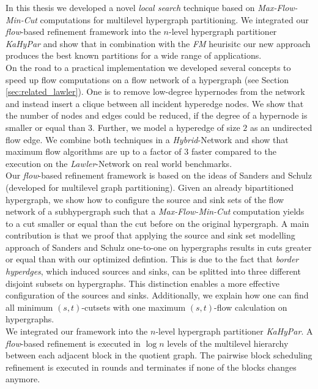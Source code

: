 In this thesis we developed a novel \emph{local search} technique based on \emph{Max-Flow-Min-Cut}
computations for multilevel hypergraph partitioning. We integrated our \emph{flow}-based
refinement framework into the $n$-level hypergraph partitioner \emph{KaHyPar} and show that
in combination with the \emph{FM} heurisitc our new approach produces the best known partitions
for a wide range of applications.\\
On the road to a practical implementation we developed several concepts to speed up flow
computations on a flow network of a hypergraph (see Section \ref{sec:related_lawler}).
One is to remove low-degree hypernodes from the network and instead insert a clique 
between all incident hyperedge nodes. We show that the number of nodes and edges could
be reduced, if the degree of a hypernode is smaller or equal than $3$. Further, we model a hyperedge
of size $2$ as an undirected flow edge. We combine both techniques in a \emph{Hybrid}-Network 
and show that maximum flow algorithms are up to a factor of $3$ faster compared to
the execution on the \emph{Lawler}-Network \cite{lawler1973} on real world benchmarks. \\
Our \emph{flow}-based refinement framework is based on the ideas of Sanders and Schulz
\cite{sanders2011engineering} (developed for multilevel graph partitioning). Given an already bipartitioned
hypergraph, we show how to configure the source and sink sets of the flow network 
of a subhypergraph such that a \emph{Max-Flow-Min-Cut} computation yields to a cut smaller 
or equal than the cut before on the original hypergraph. A main contribution is that we proof
that applying the source and sink set modelling approach of Sanders and Schulz one-to-one on 
hypergraphs results in cuts greater or equal than with our optimized defintion. This is due to
the fact that \emph{border hyperdges}, which induced sources and sinks, can be
splitted into three different disjoint subsets on hypergraphs. This distinction enables a more effective
configuration of the sources and sinks. Additionally, we explain how one can find all 
minimum $(s,t)$-cutsets with one maximum $(s,t)$-flow calculation on hypergraphs. \\
We integrated our framework into the $n$-level hypergraph partitioner
\emph{KaHyPar}. A \emph{flow}-based refinement is executed in $\log{n}$ levels of the multilevel
hierarchy between each adjacent block in the quotient graph. The pairwise block scheduling 
refinement is executed in rounds and terminates if none of the blocks changes anymore.
